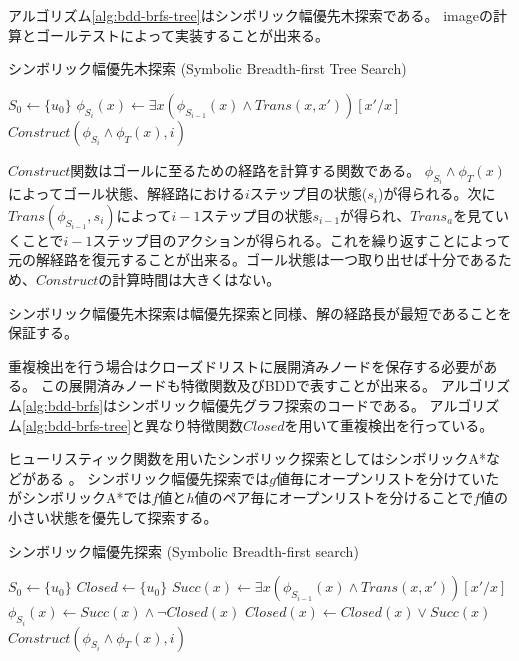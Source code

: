アルゴリズム\ref{alg:bdd-brfs-tree}はシンボリック幅優先木探索である。
imageの計算とゴールテストによって実装することが出来る。


\begin{algorithm}
\caption{シンボリック幅優先木探索 (Symbolic Breadth-first Tree Search)}
\label{alg:bdd-brfs-tree}
	$S_0 \leftarrow \{u_0\}$\;
	 {
		$\phi_{S_i}(x) \leftarrow \exists x (\phi_{S_{i-1}}(x) \land Trans(x,x'))[x'/x]$\;
		 {
			\Return $Construct(\phi_{S_i} \land \phi_T(x), i)$\;
		}
	}
\end{algorithm}


$Construct$関数はゴールに至るための経路を計算する関数である。
$\phi_{S_i} \land \phi_T(x)$によってゴール状態、解経路における$i$ステップ目の状態($s_i$)が得られる。次に$Trans(\phi_{S_{i-1}}, s_i)$によって$i-1$ステップ目の状態$s_{i-1}$が得られ、$Trans_a$を見ていくことで$i-1$ステップ目のアクションが得られる。これを繰り返すことによって元の解経路を復元することが出来る。ゴール状態は一つ取り出せば十分であるため、$Construct$の計算時間は大きくはない。

シンボリック幅優先木探索は幅優先探索と同様、解の経路長が最短であることを保証する。



重複検出を行う場合はクローズドリストに展開済みノードを保存する必要がある。
この展開済みノードも特徴関数及びBDDで表すことが出来る。
アルゴリズム\ref{alg:bdd-brfs}はシンボリック幅優先グラフ探索のコードである。
アルゴリズム\ref{alg:bdd-brfs-tree}と異なり特徴関数$Closed$を用いて重複検出を行っている。

ヒューリスティック関数を用いたシンボリック探索としてはシンボリックA*などがある \cite{edelkamp1998obdds}。
シンボリック幅優先探索では$g$値毎にオープンリストを分けていたがシンボリックA*では$f$値と$h$値のペア毎にオープンリストを分けることで$f$値の小さい状態を優先して探索する。


\begin{algorithm}
\caption{シンボリック幅優先探索 (Symbolic Breadth-first search)}
\label{alg:bdd-brfs}
	$S_0 \leftarrow \{u_0\}$\;
	$Closed \leftarrow \{u_0\}$\;
	 {
		$Succ(x) \leftarrow \exists x (\phi_{S_{i-1}}(x) \land Trans(x,x'))[x'/x]$\;
		$\phi_{S_i}(x) \leftarrow Succ(x) \land \lnot Closed(x)$\;
		$Closed(x) \leftarrow Closed(x) \lor Succ(x)$\;
		 {
			\Return $Construct(\phi_{S_i} \land \phi_T(x), i)$\;
		}
	}
\end{algorithm}

